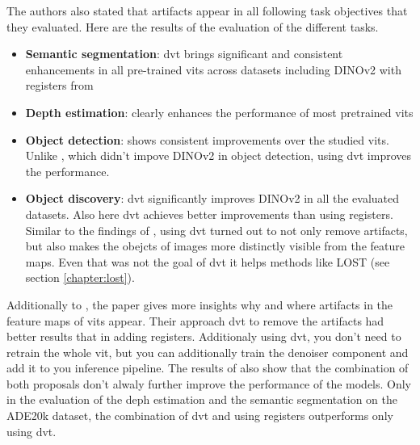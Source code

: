 \documentclass[conference]{IEEEtran}
\begin{document}
  The authors also stated that artifacts appear in all following task objectives that they evaluated. Here are the results of the evaluation of the different tasks.
  \begin{itemize}
    \item \textbf{Semantic segmentation}: \ac{dvt} brings significant and consistent
    enhancements in all pre-trained \acp{vit} across datasets including \mbox{DINOv2} with registers from \cite{registers}
    \item \textbf{Depth estimation}: clearly enhances the performance of most pretrained \acp{vit}
    \item \textbf{Object detection}: shows consistent improvements over the studied \acp{vit}. Unlike \cite{registers}, which didn't impove \mbox{DINOv2} in object detection, using \ac{dvt} improves the performance.
    \item \textbf{Object discovery}:  \ac{dvt} significantly improves
    \mbox{DINOv2} in all the evaluated datasets. Also here \ac{dvt} achieves better improvements than \cite{registers} using registers. Similar to the findings of \cite{registers}, using \ac{dvt} turned out to not only remove artifacts, but also makes the obejcts of images more distinctly visible from the feature maps. Even that was not the goal of \ac{dvt} it helps methods like \mbox{LOST} (see section \ref{chapter:lost}). \cite{denoising}
  \end{itemize}

  Additionally to \cite{registers}, the paper gives more insights why and where artifacts in the feature maps of \acp{vit} appear. Their approach \ac{dvt} to remove the artifacts had better results that in \cite{registers} adding registers. Additionaly using \ac{dvt}, you don't need to retrain the whole \ac{vit}, but you can additionally train the denoiser component and add it to you inference pipeline. The results of \cite{denoising} also show that the combination of both proposals don't alwaly further improve the performance of the models. Only in the evaluation of the deph estimation and the semantic segmentation on the ADE20k dataset, the combination of \ac{dvt} and using registers outperforms only using \ac{dvt}. \cite{denoising}
 
\end{document}
